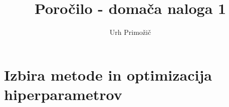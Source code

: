 \documentclass{article}
\begin{document}
\title{Poročilo - domača naloga 1}
\author{Urh Primožič}
\maketitle
\section{Izbira metode in optimizacija hiperparametrov}
\end{document}
